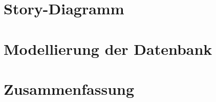 \documentclass[12pt,a4paper,oneside,ngerman]{article}
\begin{document}
\section{Story-Diagramm} %



\section{Modellierung der Datenbank} %

\section{Zusammenfassung} %
\end{document}
